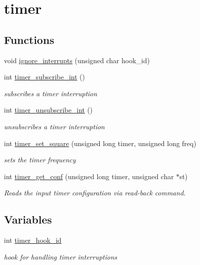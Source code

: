 \hypertarget{group__timer}{}\section{timer}
\label{group__timer}
\subsection*{Functions}
\begin{DoxyCompactItemize}
\item 
void \hyperlink{group__timer_ga05c1893c9a1e24ff5d76b2958adb8851}{ignore\+\_\+interrupts} (unsigned char hook\+\_\+id)
\item 
int \hyperlink{group__timer_ga915070da84f7a3baa2e0fe634cb4bcd8}{timer\+\_\+subscribe\+\_\+int} ()
\begin{DoxyCompactList}\small\item\em subscribes a timer interruption \end{DoxyCompactList}\item 
int \hyperlink{group__timer_gab9eea51549744bca5c5c923b388bb4ee}{timer\+\_\+unsubscribe\+\_\+int} ()
\begin{DoxyCompactList}\small\item\em unsubscribes a timer interruption \end{DoxyCompactList}\item 
int \hyperlink{group__timer_gada4efbb5c88275795526fc45f0814aa3}{timer\+\_\+set\+\_\+square} (unsigned long timer, unsigned long freq)
\begin{DoxyCompactList}\small\item\em sets the timer frequency \end{DoxyCompactList}\item 
int \hyperlink{group__timer_ga8eb3357bc05265afc4bea5bbbb480a53}{timer\+\_\+get\+\_\+conf} (unsigned long timer, unsigned char $\ast$st)
\begin{DoxyCompactList}\small\item\em Reads the input timer configuration via read-\/back command. \end{DoxyCompactList}\end{DoxyCompactItemize}
\subsection*{Variables}
\begin{DoxyCompactItemize}
\item 
int \hyperlink{group__timer_ga96e6321e488d93a8134897510c435eb7}{timer\+\_\+hook\+\_\+id}
\begin{DoxyCompactList}\small\item\em hook for handling timer interruptions \end{DoxyCompactList}\end{DoxyCompactItemize}


